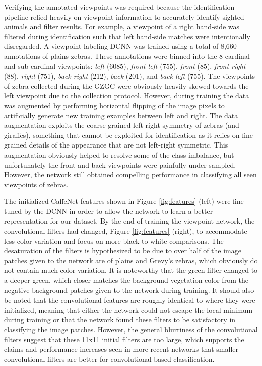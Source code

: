 Verifying the annotated viewpoints was required because the identification pipeline relied heavily on viewpoint information to accurately identify sighted animals and filter results.  For example, a viewpoint of a right hand-side was filtered during identification such that left hand-side matches were intentionally disregarded.  A viewpoint labeling DCNN was trained using a total of 8,660 annotations of plains zebras.  These annotations were binned into the 8 cardinal and sub-cardinal viewpoints: \textit{left} (6085), \textit{front-left} (755), \textit{front} (85), \textit{front-right} (88), \textit{right} (751), \textit{back-right} (212), \textit{back} (201), and \textit{back-left} (755).  The viewpoints of zebra collected during the GZGC were obviously heavily skewed towards the left viewpoint due to the collection protocol.  However, during training the data was augmented by performing horizontal flipping of the image pixels to artificially generate new training examples between left and right.  The data augmentation exploits the coarse-grained left-right symmetry of zebras (and giraffes), something that cannot be exploited for identification as it relies on fine-grained details of the appearance that are not left-right symmetric.  This augmentation obviously helped to resolve some of the class imbalance, but unfortunately the front and back viewpoints were painfully under-sampled.  However, the network still obtained compelling performance in classifying all seen viewpoints of zebras.  

The initialized CaffeNet features shown in Figure \ref{fig:features} (left) were fine-tuned by the DCNN in order to allow the network to learn a better representation for our dataset.  By the end of training the viewpoint network, the convolutional filters had changed, Figure \ref{fig:features} (right), to accommodate less color variation and focus on more black-to-white comparisons.  The desaturation of the filters is hypothesized to be due to over half of the image patches given to the network are of plains and Grevy's zebras, which obviously do not contain much color variation.  It is noteworthy that the green filter changed to a deeper green, which closer matches the background vegetation color from the negative background patches given to the network during training.  It should also be noted that the convolutional features are roughly identical to where they were initialized, meaning that either the network could not escape the local minimum during training or that the network found these filters to be satisfactory in classifying the image patches.  However, the general blurriness of the convolutional filters suggest that these 11x11 initial filters are too large, which supports the claims and performance increases seen in more recent networks \cite{sermanet_overfeat:_2013, bengio_advances_2013, simonyan_very_2014, springenberg_striving_2014, szegedy_going_2014} that smaller convolutional filters are better for convolutional-based classification.


